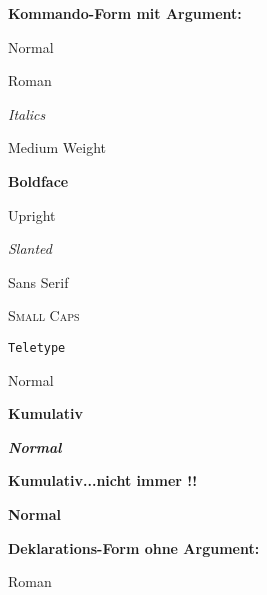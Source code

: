 \documentclass[a5paper]{article}
\begin{document}
\textbf{Kommando-Form mit Argument:}

\begin{example}
Normal
\end{example}

\begin{example}
\textrm{Roman}
\end{example}

\begin{example}
\textit{Italics}
\end{example}

\begin{example}
\textmd{Medium Weight}
\end{example}

\begin{example}
\textbf{Boldface}
\end{example}

\begin{example}
\textup{Upright}
\end{example}

\begin{example}
\textsl{Slanted}
\end{example}

\begin{example}
\textsf{Sans Serif}
\end{example}

\begin{example}
\textsc{Small Caps}
\end{example}

\begin{example}
\texttt{Teletype}
\end{example}

\begin{example}
\textnormal{Normal}
\end{example}

\textbf{Kumulativ}

\begin{example}
\textit{\textbf{Normal}}
\end{example}

\textbf{Kumulativ...nicht immer !!}

\begin{example}
\textsf{\textbf{Normal}}
\end{example}


\textbf{Deklarations-Form ohne Argument:}

\begin{example}
{\rmfamily Roman}
\end{example}
\end{document}
